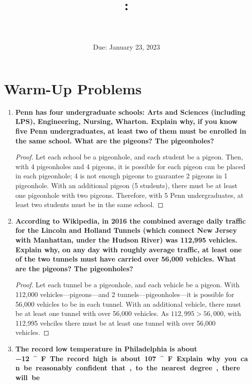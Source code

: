 \documentclass[article, 12pt]{article}
\title{
    \vspace{2in}
    \textmd{\textbf{\courseNumber: \courseName}}
    \normalsize\vspace{0.1in}\\
    \vspace{0.1in}\Large{\text{\psetName}} \\
    \vspace{0.1in}\large{\text{\professor}}
    \vspace{3in}
}
\author{\name}
\date{Due: January 23, 2023}
\theoremstyle{definition}
\newcommand{\degree}{^\circ}
\begin{document}
    \maketitle
    \thispagestyle{empty}
    \pagebreak

    \section{Warm-Up Problems}
    \begin{enumerate}[(1)]
        \item \textbf{Penn has four undergraduate schools: Arts and Sciences (including LPS), Engineering,
        Nursing, Wharton. Explain why, if you know five Penn undergraduates, at least two of
        them must be enrolled in the same school. What are the pigeons? The pigeonholes?}
        \begin{proof}
            Let each school be a pigeonhole, and each student be a pigeon. Then, with 4 pigeonholes and 4 pigeons, it is possible for each pigeon can be placed in each pigeonhole; 4 is not enough pigeons to guarantee 2 pigeons in 1 pigeonhole. With an additional pigeon (5 students), there must be at least one pigeonhole with two pigeons. Therefore, with 5 Penn undergraduates, at least two students must be in the same school.
        \end{proof}
        \item \textbf{According to Wikipedia, in 2016 the combined average daily traffic for the Lincoln and
        Holland Tunnels (which connect New Jersey with Manhattan, under the Hudson River)
        was 112,995 vehicles. Explain why, on any day with roughly average traffic, at least one
        of the two tunnels must have carried over 56,000 vehicles. What are the pigeons? The
        pigeonholes?}
        \begin{proof}
            Let each tunnel be a pigeonhole, and each vehicle be a pigeon. With 112,000 vehicles---pigeons---and 2 tunnels---pigeonholes---it is possible for 56,000 vehicles to be in each tunnel. With an additional vehicle, there must be at least one tunnel with over 56,000 vehicles. As $112,995>56,000$, with 112,995 vehciles there must be at least one tunnel with over 56,000 vehicles.
        \end{proof}
        \item \textbf{The record low temperature in Philadelphia is about \SI{-12}{\degree} F. The record high is about \SI{107}{\degree}
        F. Explain why you can be reasonably confident that, to the nearest degree, there will be
}
\end{enumerate}
\end{document}
